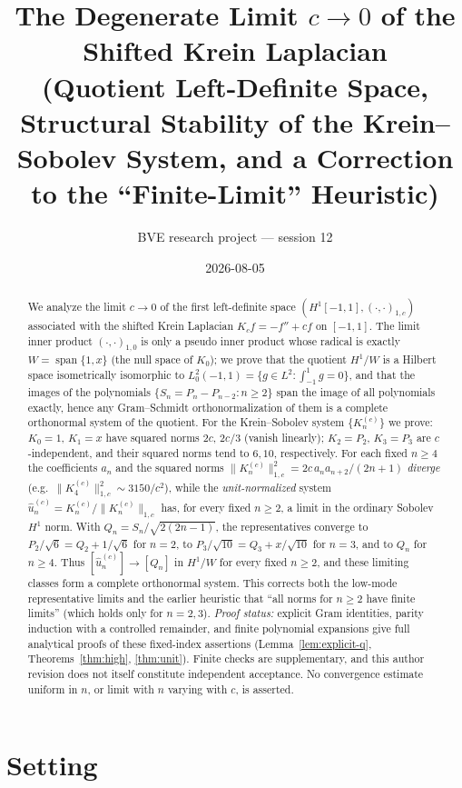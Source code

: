 ﻿\documentclass[11pt]{article}
\title{The Degenerate Limit $c\to 0$ of the Shifted Krein Laplacian\\ \large (Quotient Left-Definite Space, Structural Stability of the Krein--Sobolev System, and a Correction to the ``Finite-Limit'' Heuristic)}
\author{BVE research project --- session 12}
\date{2026-08-05}
\begin{document}
\maketitle

\begin{abstract}
We analyze the limit $c\to 0$ of the first left-definite space
$(H^1[-1,1],(\cdot,\cdot)_{1,c})$ associated with the shifted Krein Laplacian
$K_c f = -f''+cf$ on $[-1,1]$.  The limit inner product
$(\cdot,\cdot)_{1,0}$ is only a pseudo inner product whose radical is exactly
$W=\operatorname{span}\{1,x\}$ (the null space of $K_0$); we prove that the
quotient $H^1/W$ is a Hilbert space isometrically isomorphic to
$L^2_0(-1,1)=\{g\in L^2: \int_{-1}^1 g=0\}$, and that the images of the
polynomials $\{S_n=P_n-P_{n-2}: n\ge 2\}$ span the image of all polynomials
exactly, hence any Gram--Schmidt orthonormalization of them is a complete
orthonormal system of the quotient.  For the Krein--Sobolev system
$\{K_n^{(c)}\}$ we prove: $K_0=1$, $K_1=x$ have squared norms $2c$, $2c/3$
(vanish linearly); $K_2=P_2$, $K_3=P_3$ are $c$-independent, and their
squared norms tend to $6,10$, respectively.  For each fixed $n\ge4$ the
coefficients $a_n$ and the squared norms
$\|K_n^{(c)}\|_{1,c}^2=2c\,a_n a_{n+2}/(2n+1)$ \emph{diverge} (e.g.\
$\|K_4^{(c)}\|_{1,c}^2\sim 3150/c^2$), while the \emph{unit-normalized} system
$\widehat u_n^{(c)}=K_n^{(c)}/\|K_n^{(c)}\|_{1,c}$ has, for every fixed
$n\ge2$, a limit in the ordinary Sobolev $H^1$ norm.  With
$Q_n=S_n/\sqrt{2(2n-1)}$, the representatives converge to
$P_2/\sqrt6=Q_2+1/\sqrt6$ for $n=2$, to
$P_3/\sqrt{10}=Q_3+x/\sqrt{10}$ for $n=3$, and to $Q_n$ for $n\ge4$.
Thus $[\widehat u_n^{(c)}]\to[Q_n]$ in $H^1/W$ for every fixed $n\ge2$,
and these limiting classes form a complete orthonormal system.  This
corrects both the low-mode representative limits and the earlier
heuristic that ``all norms for $n\ge 2$ have finite limits'' (which holds only
for $n=2,3$).  \emph{Proof status:} explicit Gram identities, parity
induction with a controlled remainder, and finite polynomial expansions
give full analytical proofs of these fixed-index assertions
(Lemma~\ref{lem:explicit-q}, Theorems~\ref{thm:high}, \ref{thm:unit}).
Finite checks are supplementary, and this author revision does not itself
constitute independent acceptance.  No convergence estimate uniform in
$n$, or limit with $n$ varying with $c$, is asserted.
\end{abstract}

\section{Setting}
\end{document}
